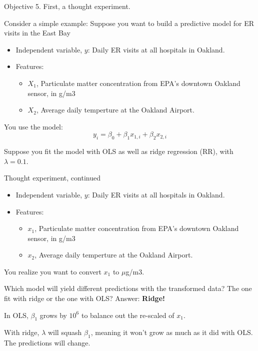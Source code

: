 \documentclass[mathserif, handout, aspectratio=169]{beamer}
\begin{document}
\begin{frame}{Objective 5.  First, a thought experiment.}

	Consider a simple example:  Suppose you want to build a predictive model for ER visits in the East Bay
	\begin{itemize}
		\item Independent variable, $y$: Daily ER visits at all hospitals in Oakland.
		\item Features: 
			\begin{itemize}
				\item $X_1$, Particulate matter concentration from EPA's downtown Oakland sensor, in g/m3 
				\item $X_2$, Average daily temperture at the Oakland Airport.  
			\end{itemize}
	\end{itemize}

	You use the model:
	\begin{equation*}
		y_i = \beta_0 + \beta_1 x_{1,i} + \beta_2 x_{2,i}
	\end{equation*}

	Suppose you fit the model with OLS as well as ridge regression (RR), with $\lambda = 0.1$.    
\end{frame}

\begin{frame}{Thought experiment, continued}

	\begin{itemize}
		\item Independent variable, $y$: Daily ER visits at all hospitals in Oakland.
		\item Features: 
			\begin{itemize}
				\item $x_1$, Particulate matter concentration from EPA's downtown Oakland sensor, in g/m3 
				\item $x_2$, Average daily temperture at the Oakland Airport.  
			\end{itemize}
	\end{itemize}

	You realize you want to convert $x_1$ to $\mu$g/m3.  

	\vspace{5mm}

	Which model will yield different predictions with the transformed data?  The one fit with ridge or the one with OLS? \pause Answer: \textbf{Ridge!}   
	\vspace{5mm}

	In OLS, $\beta_1$ grows by $10^6$ to balance out the re-scaled of $x_1$.  
	\vspace{5mm}

	With ridge, $\lambda$ will squash $\beta_1$, meaning it won't grow as much as it did with OLS.  The predictions will change.
\end{frame}
\end{document}
